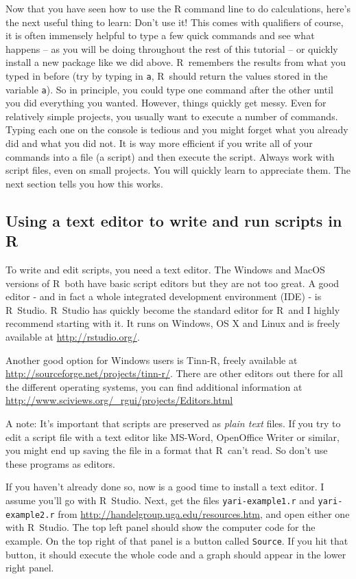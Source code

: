 \documentclass [11pt]{article}
\newcommand{\code}[1]{{\tt #1}}
\newcommand\R{{\sf R}}
\numberwithin{exercise}{section}
\begin{document}
Now that you have seen how to use the R command line to do calculations, here's the next useful thing to learn: Don't use it! This comes with qualifiers of course, it is often immensely helpful to type a few quick commands and see what happens -- as you will be doing throughout the rest of this tutorial -- or quickly install a new package like we did above. \R\ remembers the results from what you typed in before (try by typing in \code{a}, \R\ should return the values stored in the variable \code{a}). So in principle, you could type one command after the other until you did everything you wanted. However, things quickly get messy. Even for relatively simple projects, you usually want to execute a number of commands. Typing each one on the console is tedious and you might forget what you already did and what you did not. It is way more efficient if you write all of your commands into a file (a script) and then execute the script. Always work with script files, even on small projects. You will quickly learn to appreciate them. The next section tells you how this works.


\subsection{Using a text editor to write and run scripts in \R}
To write and edit scripts, you need a text editor. The Windows and MacOS versions of \R\ both have basic script editors but they are not too great. 
A good editor - and in fact a whole integrated development environment (IDE) - is \R\ Studio. \R\ Studio has quickly become the standard editor for \R\ and I highly recommend starting with it. It runs on Windows, OS X and Linux and is freely available at \url{http://rstudio.org/}. 

Another good option for Windows users is Tinn-R, freely available at
 \url{http://sourceforge.net/projects/tinn-r/}. There are other editors out there for all the different operating systems, you can find additional information at
\url{http://www.sciviews.org/_rgui/projects/Editors.html}

A note: It's important that scripts are preserved as \emph{plain text} files. If you try to edit a script file with a text editor like MS-Word, OpenOffice Writer or similar, you might end up saving the file in a format that \R\ can't read. So don't use these programs as editors.

If you haven't already done so, now is a good time to install a text editor. I assume you'll go with \R\ Studio. Next, get the files \code{yari-example1.r} and \code{yari-example2.r} from \url{http://handelgroup.uga.edu/resources.htm}, and open either one with \R\ Studio. The top left panel should show the computer code for the example. On the top right of that panel is a button called \code{Source}. If you hit that button, it should execute the whole code and a graph should appear in the lower right panel.  
\end{document}
